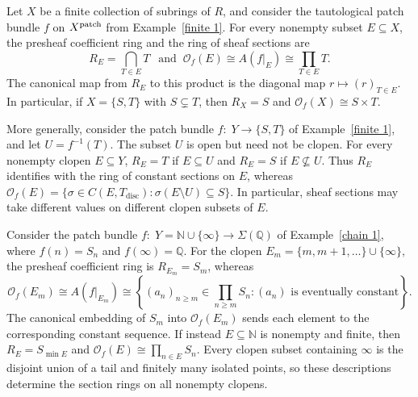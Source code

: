 \documentclass[11pt]{amsart}
\begin{document}
\begin{example}
Let $X$ be a finite collection of subrings of $R$, and consider the tautological patch bundle $f$ on $X^{\rm patch}$ from Example~\ref{finite 1}. For every nonempty subset $E\subseteq X$, the presheaf coefficient ring and the ring of sheaf sections are
$$ R_E=\bigcap_{T\in E}T \: \:\text{ and } \: \mathcal O_f(E)\cong A(f|_E)\cong\prod_{T\in E}T. $$
The canonical map from $R_E$ to this product is the diagonal map $r\mapsto(r)_{T\in E}$.  In particular, if $X=\{S,T\}$ with $S\subsetneq T$, then
$ R_X=S$ and $\mathcal O_f(X)\cong S\times T.$

More generally, consider the patch bundle $f\colon\; Y\to\{S,T\}$ of Example~\ref{finite 1}, and let $U=f^{-1}(T)$. The subset $U$ is open but need not be clopen. For every nonempty clopen $E\subseteq Y$, $ R_E=T$ if $E \subseteq U$ and $R_E=S$ if $E \not \subseteq U$. Thus $R_E$ identifies with the ring of
constant sections on $E$, whereas
$\mathcal O_f(E)=
\{\sigma\in C(E,T_{\mathrm{disc}}):
\sigma(E\setminus U)\subseteq S\}.$
In particular, sheaf sections may take different values on different clopen subsets of $E$. 
\end{example}

\begin{example}
Consider the patch bundle $f\colon\; Y=\mathbb N\cup\{\infty\}\to\Sigma(\mathbb Q)$ of Example~\ref{chain 1}, where $f(n)=S_n$ and $f(\infty)=\mathbb Q$. For the clopen  $ E_m=\{m,m+1,\ldots\}\cup\{\infty\}, $ the presheaf coefficient ring is $R_{E_m}=S_m$, whereas
$$ \mathcal O_f(E_m)\cong A(f|_{E_m})\cong
\left\{
(a_n)_{n\ge m}\in\prod_{n\ge m}S_n: (a_n)\text{ is eventually constant} \right\}. $$
The canonical embedding of $S_m$ into $\mathcal O_f(E_m)$ sends each element to the corresponding constant sequence. If instead $E\subseteq\mathbb N$ is nonempty and finite, then $ R_E=S_{\min E} $ and 
$\mathcal O_f(E)\cong\prod_{n\in E}S_n. $
Every clopen subset containing $\infty$ is the disjoint union of a tail and finitely many isolated points, so these descriptions determine the section rings on all nonempty clopens.
\end{example}
\end{document}
